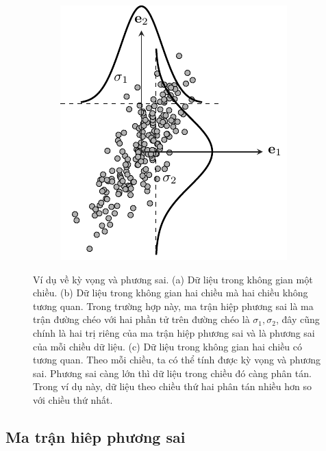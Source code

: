 \begin{figure}[t]
\begin{subfigure}{0.325\textwidth}
\includegraphics[width=0.99\linewidth]{Chapters/07_DimemsionalityReduction/27_pca/latex/pca_var0.pdf}
\caption{}
\label{fig:27_2c}
\end{subfigure}
\caption{
Ví dụ về kỳ vọng và phương sai. (a) Dữ liệu trong không gian
một chiều. (b) Dữ liệu trong không gian hai chiều mà hai chiều
không tương quan. Trong trường hợp này, ma trận hiệp phương sai là ma trận
đường chéo với hai phần tử trên đường chéo  là $\sigma_1, \sigma_2$, đây
cũng chính là hai trị riêng của ma trận hiệp phương sai và là phương sai
của mỗi chiều dữ liệu. (c) Dữ liệu trong không gian hai chiều có tương
quan. Theo mỗi chiều, ta có thể tính được kỳ vọng và phương sai. Phương sai
càng lớn thì dữ liệu trong chiều đó càng phân tán. Trong ví dụ này, dữ liệu
theo chiều thứ hai phân tán nhiều hơn so với chiều thứ nhất. }
\label{fig:27_2}
\end{figure}

\subsection{Ma trận hiêp phương sai}

